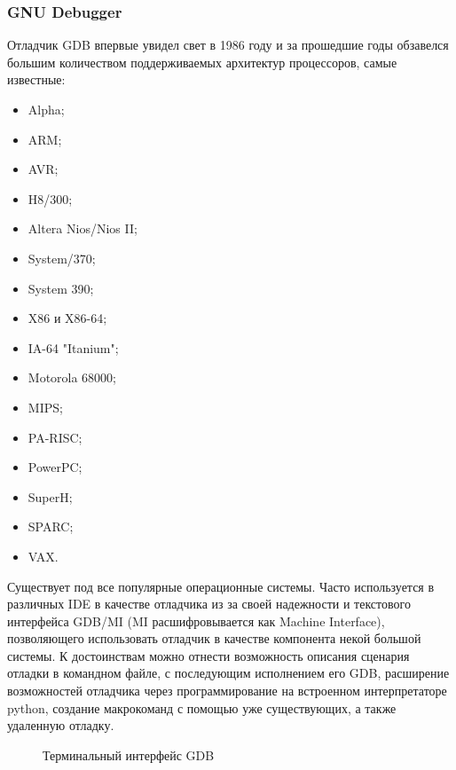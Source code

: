 \subsubsection{GNU Debugger}\label{sec:ch1/sec3/sub2/sub2}
Отладчик GDB впервые увидел свет в 1986 году и за прошедшие годы обзавелся
большим количеством поддерживаемых архитектур процессоров, самые известные:
\begin{itemize}
    \item Alpha;
    \item ARM;
    \item AVR;
    \item H8/300;
    \item Altera Nios/Nios II;
    \item System/370;
    \item System 390;
    \item X86 и X86-64;
    \item IA-64 "Itanium";
    \item Motorola 68000;
    \item MIPS;
    \item PA-RISC;
    \item PowerPC;
    \item SuperH;
    \item SPARC;
    \item VAX.
\end{itemize}
Существует под все популярные операционные системы. Часто используется в различных IDE в качестве
отладчика из за своей надежности и текстового интерфейса GDB/MI (MI расшифровывается как Machine
Interface), позволяющего использовать отладчик в качестве компонента некой большой системы.
К достоинствам можно отнести возможность описания сценария отладки в командном файле,
с последующим исполнением его GDB, расширение возможностей отладчика через программирование
на встроенном интерпретаторе python, создание макрокоманд с помощью уже существующих,
а также удаленную отладку.
\begin{figure}[!htbp]
    \caption{Терминальный интерфейс GDB \label{fig:gdb-tui}}
\end{figure}

